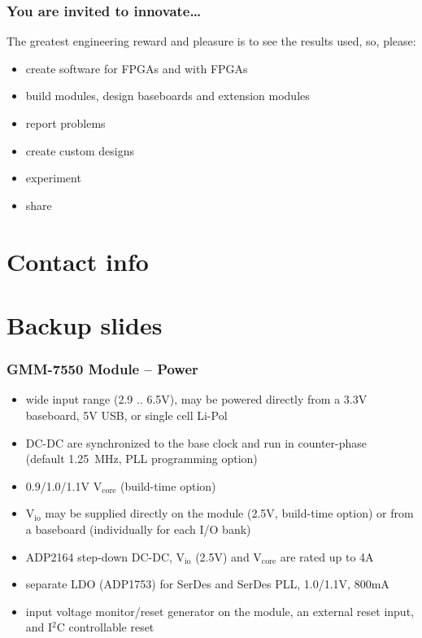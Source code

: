 \begin{frame}
  \frametitle{You are invited to innovate\dots}

  The greatest engineering reward and pleasure is to see the results
  used, so, please:

  \vspace{.5cm}

  \begin{itemize}
  \item create software for FPGAs and with FPGAs
  \item build modules, design baseboards and extension modules
  \item report problems
  \item create custom designs
  \item experiment
  \item share
  \end{itemize}

  \vspace{-2cm}
  \begin{flushright}
    
  \end{flushright}

\end{frame}

\section{Contact info}


\section{Backup slides}

\begin{frame}
  \frametitle{GMM-7550 Module -- Power}
  \begin{itemize}
  \item wide input range (2.9 .. 6.5V), may be powered directly from a
  3.3V baseboard, 5V USB, or single cell Li-Pol
  \item DC-DC are synchronized to the base clock and run in
  counter-phase\\(default 1.25~MHz, PLL programming option)
  \item 0.9/1.0/1.1V V$_{\text{core}}$ (build-time option)
  \item V$_{\text{io}}$ may be supplied directly on the module (2.5V, build-time
  option) or from\\a baseboard (individually for each I/O bank)
  \item ADP2164 step-down DC-DC, V$_{\text{io}}$ (2.5V) and V$_{\text{core}}$ are rated up to 4A
  \item separate LDO (ADP1753) for SerDes and SerDes PLL, 1.0/1.1V, 800mA
  \item input voltage monitor/reset generator on the module, an
  external reset input, and I$^2$C controllable reset
  \end{itemize}
\end{frame}

